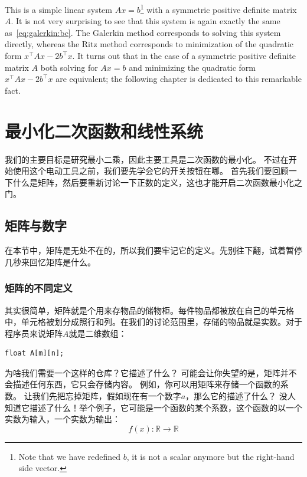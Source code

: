 \documentclass[notitlepage,oneside]{book}
\makeatletter
\newcommand{\authoredby}[1]{\addtocontents{toc}{\protect\@nameuse{authoredby#1}}}%
\makeatother
\begin{document}
This is a simple linear system $Ax=b$\footnote{Note that we have redefined $b$, it is not a scalar anymore but the right-hand side vector.} with a symmetric positive definite matrix $A$.
It is not very surprising to see that this system is again exactly the same as~\eqref{eq:galerkin:bc}.
The Galerkin method corresponds to solving this system directly, whereas the Ritz method corresponds to minimization of the quadratic form $x^\top A x - 2b^\top x$.
It turns out that in the case of a symmetric positive definite matrix $A$ both solving for $Ax=b$ and minimizing the quadratic form $x^\top A x - 2b^\top x$ are equivalent;
the following chapter is dedicated to this remarkable fact.

\authoredby{B}
\chapter{最小化二次函数和线性系统}
\fancyhead[R]{\textcolor{ao(english)}{core text}}
\label{sec:mineqlin}

我们的主要目标是研究最小二乘，因此主要工具是二次函数的最小化。
不过在开始使用这个电动工具之前，我们要先学会它的开关按钮在哪。
首先我们要回顾一下什么是矩阵，然后要重新讨论一下正数的定义，这也才能开启二次函数最小化之门。


\section{矩阵与数字}
在本节中，矩阵是无处不在的，所以我们要牢记它的定义。先别往下翻，试着暂停几秒来回忆矩阵是什么。


\subsection{矩阵的不同定义}

其实很简单，矩阵就是个用来存物品的储物柜。每件物品都被放在自己的单元格中，单元格被划分成照行和列。在我们的讨论范围里，存储的物品就是实数。对于程序员来说矩阵$A$就是二维数组：

\begin{verbatim}
float A[m][n];
\end{verbatim}

为啥我们需要一个这样的仓库？它描述了什么？
可能会让你失望的是，矩阵并不会描述任何东西，它只会存储内容。
例如，你可以用矩阵来存储一个函数的系数。
让我们先把忘掉矩阵，假如现在有一个数字$a$，那么它的描述了什么？
没人知道它描述了什么！举个例子，它可能是一个函数的某个系数，这个函数的以一个实数为输入，一个实数为输出：
$$
f(x) : \mathbb R \rightarrow \mathbb R
$$
\end{document}
